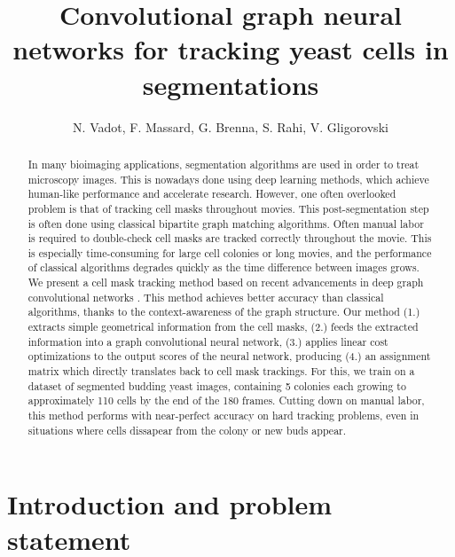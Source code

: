 \documentclass[10pt,conference,compsocconf,a4paper]{IEEEtran}
\begin{document}
\title{Convolutional graph neural networks for tracking yeast cells in segmentations}

\author{
	N. Vadot, F. Massard, G. Brenna, S. Rahi, V. Gligorovski
}

\maketitle

\begin{abstract}
	In many bioimaging applications, segmentation algorithms are used in order to treat microscopy images. This is nowadays done using deep learning methods, which achieve human-like performance and accelerate research.
	However, one often overlooked problem is that of tracking cell masks throughout movies. This post-segmentation step is often done using classical bipartite graph matching algorithms.
	Often manual labor is required to double-check cell masks are tracked correctly throughout the movie. This is especially time-consuming for large cell colonies or long movies, and the performance of classical algorithms degrades quickly as the time difference between images grows.
	We present a cell mask tracking method based on recent advancements in deep graph convolutional networks \cite{li_deepergcn_2020}. This method achieves better accuracy than classical algorithms, thanks to the context-awareness of the graph structure. Our method (1.) extracts simple geometrical information from the cell masks, 
	(2.) feeds the extracted information into a graph convolutional neural network, 
	(3.) applies linear cost optimizations to the output scores of the neural network, producing 
	(4.) an assignment matrix which directly translates back to cell mask trackings. For this, we train on a dataset of segmented budding yeast images, containing 5 colonies each growing to approximately 110 cells by the end of the 180 frames.
	Cutting down on manual labor, this method performs with near-perfect accuracy on hard tracking problems, even in situations where cells dissapear from the colony or new buds appear.
\end{abstract}


\section{Introduction and problem statement}
\end{document}
